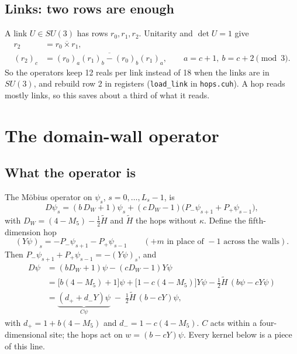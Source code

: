 \documentclass[11pt,a4paper]{article}
\numberwithin{equation}{section}
\newcommand{\code}[1]{\texttt{\small #1}}
\begin{document}
\subsection{Links: two rows are enough}

A link $U\in SU(3)$ has rows $r_0,r_1,r_2$. Unitarity and $\det U=1$ give
\begin{align}
r_2 &= \overline{r_0\times r_1},\\
(r_2)_c &= \overline{(r_0)_a(r_1)_b - (r_0)_b(r_1)_a},\qquad a=c+1,\ b=c+2\pmod 3 .
\end{align}
So the operators keep 12 reals per link instead of 18 when the links are in $SU(3)$, and rebuild
row 2 in registers (\code{load\_link} in \code{hops.cuh}). A hop reads mostly links, so this
saves about a third of what it reads.

\section{The domain-wall operator}

\subsection{What the operator is}

The Möbius operator on $\psi_s$, $s=0,\dots,L_s-1$, is
\begin{equation}
D\psi_s = (b\,D_W+1)\psi_s + (c\,D_W-1)\big(P_-\psi_{s+1}+P_+\psi_{s-1}\big),
\end{equation}
with $D_W = (4-M_5) - \tfrac12\tilde H$ and $\tilde H$ the hops without $\kappa$. Define the
fifth-dimension hop
\begin{equation}
(Y\psi)_s = -P_-\psi_{s+1} - P_+\psi_{s-1}\qquad(+m\text{ in place of }-1\text{ across the walls}).
\end{equation}
Then $P_-\psi_{s+1}+P_+\psi_{s-1} = -(Y\psi)_s$, and
\begin{align}
D\psi &= (bD_W+1)\psi - (cD_W-1)Y\psi\\
&= \big[b(4-M_5)+1\big]\psi + \big[1-c(4-M_5)\big]Y\psi - \tfrac12\tilde H\,(b\psi - cY\psi)\\
&= \underbrace{(d_+ + d_-Y)\psi}_{C\psi} \;-\; \tfrac12\tilde H\,(b - cY)\psi,
\end{align}
with $d_+ = 1+b(4-M_5)$ and $d_- = 1-c(4-M_5)$. $C$ acts within a four-dimensional site; the
hops act on $w=(b-cY)\psi$. Every kernel below is a piece of this line.
\end{document}
